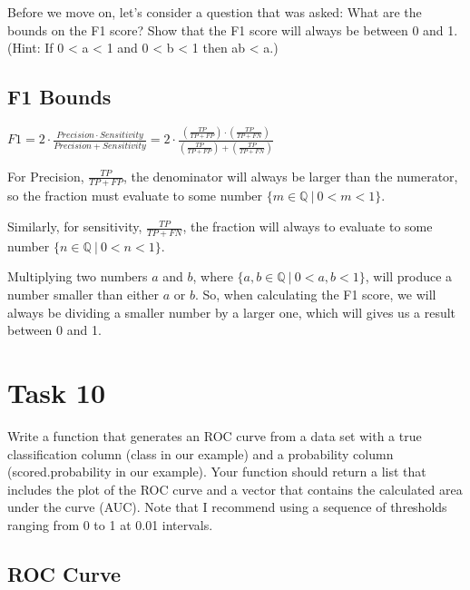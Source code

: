 \documentclass[]{article}
\begin{document}
Before we move on, let's consider a question that was asked: What are
the bounds on the F1 score? Show that the F1 score will always be
between 0 and 1. (Hint: If 0 \textless{} a \textless{} 1 and 0
\textless{} b \textless{} 1 then ab \textless{} a.)

\subsection{F1 Bounds}\label{f1-bounds}

\(F1 = 2\cdot\frac{Precision\cdot Sensitivity}{Precision + Sensitivity} = 2\cdot \frac{(\frac{TP}{TP + FP})\cdot(\frac{TP}{TP + FN})}{(\frac{TP}{TP + FP}) + (\frac{TP}{TP + FN})}\)

For Precision, \(\frac{TP}{TP + FP}\), the denominator will always be
larger than the numerator, so the fraction must evaluate to some number
\(\{m \in \mathbb{Q} \ | \ 0 < m < 1\}\).

Similarly, for sensitivity, \(\frac{TP}{TP + FN}\), the fraction will
always to evaluate to some number
\(\{n \in \mathbb{Q} \ | \ 0 < n < 1\}\).

Multiplying two numbers \(a\) and \(b\), where
\(\{a,b \in \mathbb{Q} \ | \ 0 < a,b < 1\}\), will produce a number
smaller than either \(a\) or \(b\). So, when calculating the F1 score,
we will always be dividing a smaller number by a larger one, which will
gives us a result between 0 and 1.

\section{Task 10}\label{task-10}

Write a function that generates an ROC curve from a data set with a true
classification column (class in our example) and a probability column
(scored.probability in our example). Your function should return a list
that includes the plot of the ROC curve and a vector that contains the
calculated area under the curve (AUC). Note that I recommend using a
sequence of thresholds ranging from 0 to 1 at 0.01 intervals.

\subsection{ROC Curve}\label{roc-curve}
\end{document}
